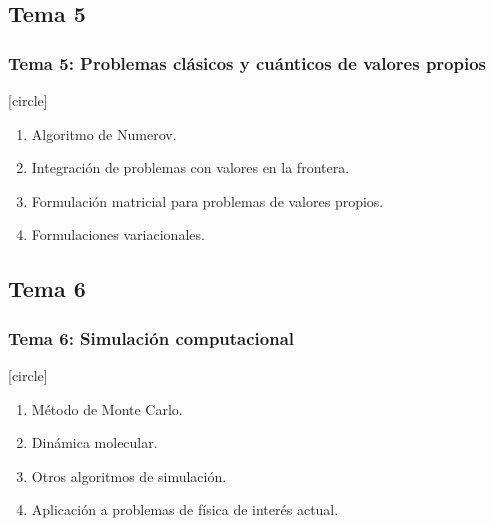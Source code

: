 \subsection*{Tema 5}
\begin{frame}
\frametitle{\textbf{Tema 5: Problemas clásicos y cuánticos de valores propios}}
[circle]
\begin{enumerate}[<+->]
\item Algoritmo de Numerov.
\item Integración de problemas con valores en la frontera.
\item Formulación matricial para problemas de valores propios.
\item Formulaciones variacionales.
\end{enumerate}
\end{frame}
\subsection*{Tema 6}
\begin{frame}
\frametitle{\textbf{Tema 6: Simulación computacional}}
[circle]
\begin{enumerate}[<+->]
\item Método de Monte Carlo.
\item Dinámica molecular.
\item Otros algoritmos de simulación.
\item Aplicación a problemas de física de interés actual.
\end{enumerate}
\end{frame}
